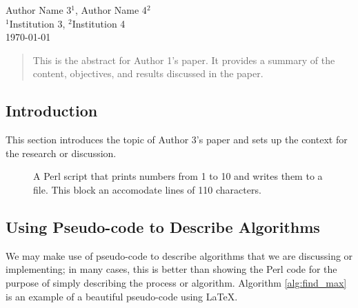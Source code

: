 \begin{center}
    \large Author Name 3$^{1}$, Author Name 4$^{2}$\\
    \small $^{1}$Institution 3, $^{2}$Institution 4\\
    \today
\end{center}

\begin{abstract}
    This is the abstract for Author 1's paper. It provides a summary of the content, objectives, and results discussed in the paper.
\end{abstract}

\subsection{Introduction}
This section introduces the topic of Author 3's paper and sets up the context for the research or discussion.

\lipsum[1-2] %

\begin{figure}[H]
\centering
{}
\caption{A Perl script that prints numbers from 1 to 10 and writes them to a file. This block an accomodate lines of 110 characters.}
\label{fig:perl_example}
\end{figure}

\subsection{Using Pseudo-code to Describe Algorithms}

We may make use of pseudo-code to describe algorithms that we are discussing or implementing; in many cases, this is better than showing the Perl code for the purpose of simply describing the process or algorithm. Algorithm \ref{alg:find_max} is an example of a beautiful pseudo-code using \LaTeX.

